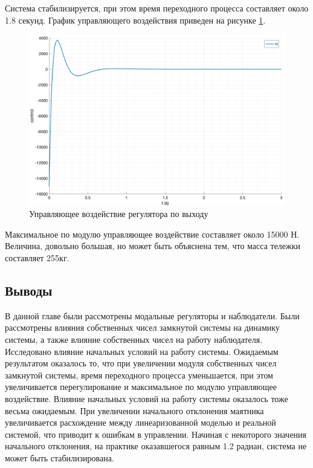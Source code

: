Система стабилизируется, при этом время переходного процесса составляет около 1.8 секунд. 
График управляющего воздействия приведен на рисунке \ref{fig:modal_controller_obderver_u}.
\begin{figure}[ht!]
    \centering
    \includegraphics[width=\textwidth]{media/plots/observer_controoler/observer_controller_u.png}
    \caption{Управляющее воздействие регулятора по выходу}
    \label{fig:modal_controller_obderver_u}
\end{figure}
Максимальное по модулю управляющее воздействие составляет около 15000 Н. Величина, довольно большая, 
но может быть объяснена тем, что масса тележки составляет 255кг. 

\FloatBarrier
\subsection{Выводы} 
В данной главе были рассмотрены модальные регуляторы и наблюдатели. Были рассмотрены влияния собственных 
чисел замкнутой системы на динамику системы, а также влияние собственных чисел на работу наблюдателя. 
Исследовано влияние начальных условий на работу системы. Ожидаемым результатом оказалось то, что 
при увеличении модуля собственных чисел замкнутой системы, время переходного процесса уменьшается, 
при этом увеличивается перегулирование и максимальное по модулю управляющее воздействие. 
Влияние начальных условий на работу системы оказалось тоже весьма ожидаемым. При увеличении 
начального отклонения маятника увеличивается расхождение между линеаризованной моделью и реальной системой, 
что приводит к ошибкам в управлении. Начиная с некоторого значения начального отклонения, 
на практике оказавшегося равным 1.2 радиан, система не может быть стабилизирована. 